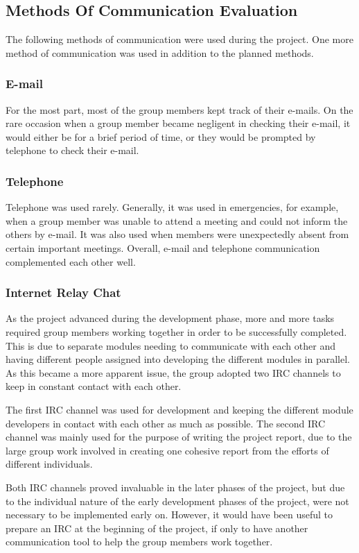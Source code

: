 \subsection{Methods Of Communication Evaluation}

The following methods of communication were used
during the project. One more method of communication
was used in addition to the planned methods.

\subsubsection{E-mail}

For the most part, most of the group members kept track
of their e-mails. On the rare occasion when a group member
became negligent in checking their e-mail, it would either be 
for a brief period of time, or they would be prompted by
telephone to check their e-mail.

\subsubsection{Telephone}

Telephone was used rarely. Generally, it was used in 
emergencies, for example, 
when a group member was unable to attend a meeting
and could not inform the others by e-mail. It was also
used when members were unexpectedly absent from 
certain important meetings. Overall, e-mail and 
telephone communication complemented each other well.

\subsubsection{Internet Relay Chat}

As the project advanced during the development phase,
more and more tasks required group members working together
in order to be successfully completed. This is due to 
separate modules needing to communicate with each other
and having different people assigned into developing the different modules
in parallel. As this became a more apparent issue, the group adopted
two IRC channels to keep in constant contact with each other.

The first IRC channel was used for development and keeping the 
different module developers in contact with each other as much as possible. 
The second IRC channel was mainly used for the purpose of writing the project
report, due to the large group work involved in creating one cohesive report
from the efforts of different individuals.

Both IRC channels proved invaluable in the later phases of the project, but
due to the individual nature of the early development phases of the project,
were not necessary to be implemented early on. However, it would have been
useful to prepare an IRC at the beginning of the project, if only to have 
another communication tool to help the group members work together.
